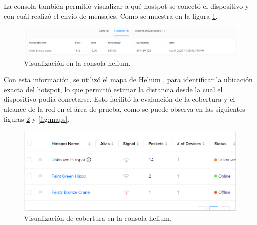 La consola también permitió visualizar a qué hostpot se conectó el dispositivo y con cuál realizó el envío de mensajes. Como se muestra en la figura \ref{fig:hostpot}.

\begin{figure}[H]
\leavevmode
\begin{minipage}{\textwidth}
\begin{center}
\includegraphics[width=\textwidth]{./capitulo_05/imagen/hostpot.png}
\caption{Visualización en la consola helium.\label{fig:hostpot}}
\end{center}
\end{minipage}
\end{figure}

Con esta información, se utilizó el mapa de Helium \cite{Helium_Explorer}, para identificar la ubicación exacta del hotspot, lo que permitió estimar la distancia desde la cual el dispositivo podía conectarse. Esto facilitó la evaluación de la cobertura y el alcance de la red en el área de prueba, como se puede observa en las siguientes figuras \ref{fig:coverage} y \ref{fig:maps}.

\begin{figure}[H]
\leavevmode
\begin{minipage}{\textwidth}
\begin{center}
\includegraphics[width=\textwidth]{./capitulo_05/imagen/Coverage.png}
\caption{Visualización de cobertura en la consola helium.\label{fig:coverage}}
\end{center}
\end{minipage}
\end{figure}

